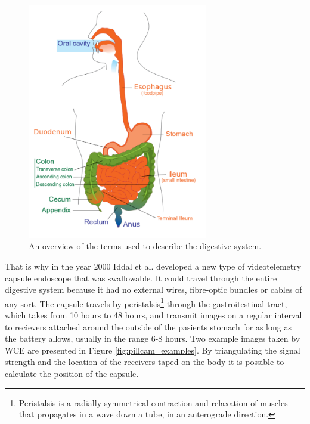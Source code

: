\documentclass[english, a4paper]{report}
\begin{document}
\begin{figure}
  \begin{center}
    \includegraphics[width=0.7\textwidth]{digestive-system}
    \caption{An overview of the terms used to describe the digestive system. \cite{DigestiveSystem} }
    \label{fig:digestive_system}
  \end{center}
\end{figure}

That is why in the year 2000 Iddal et al.\autocite{WirelessCapsule00} developed a new type of videotelemetry capsule endoscope that was swallowable. It could travel through the entire digestive system because it had no external wires, fibre-optic bundles or cables of any sort. The capsule travels by peristalsis\footnote{Peristalsis is a radially symmetrical contraction and relaxation of muscles that propagates in a wave down a tube, in an anterograde direction.} through the gastroitestinal tract, which takes from 10 hours to 48 hours, and transmit images on a regular interval to recievers attached around the outside of the pasients stomach for as long as the battery allows, usually in the range 6-8 hours. Two example images taken by WCE are presented in Figure \ref{fig:pillcam_examples}. By triangulating the signal strength and the location of the receivers taped on the body it is possible to calculate the position of the capsule.
\end{document}
